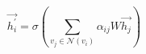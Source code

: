 \begin{equation}
\vec{h_i^\prime}=\sigma\left(\sum_{v_j \in \mathcal{N}\left(v_i\right)} \alpha_{i j} W \vec{h_j}\right)
\label{formula:GATConv}
\end{equation}